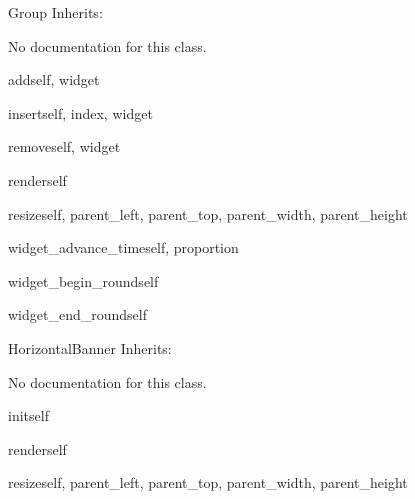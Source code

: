 \begin{classdesc*}{Group}
Inherits:

No documentation for this class.

\begin{methoddesc}{add}{self, widget}
\end{methoddesc}

\begin{methoddesc}{insert}{self, index, widget}
\end{methoddesc}

\begin{methoddesc}{remove}{self, widget}
\end{methoddesc}

\begin{methoddesc}{render}{self}
\end{methoddesc}

\begin{methoddesc}{resize}{self, parent_left, parent_top, parent_width, parent_height}
\end{methoddesc}

\begin{methoddesc}{widget_advance_time}{self, proportion}
\end{methoddesc}

\begin{methoddesc}{widget_begin_round}{self}
\end{methoddesc}

\begin{methoddesc}{widget_end_round}{self}
\end{methoddesc}

\end{classdesc*}

\begin{classdesc*}{HorizontalBanner}
Inherits:

No documentation for this class.

\begin{methoddesc}{init}{self}
\end{methoddesc}

\begin{methoddesc}{render}{self}
\end{methoddesc}

\begin{methoddesc}{resize}{self, parent_left, parent_top, parent_width, parent_height}
\end{methoddesc}

\end{classdesc*}

